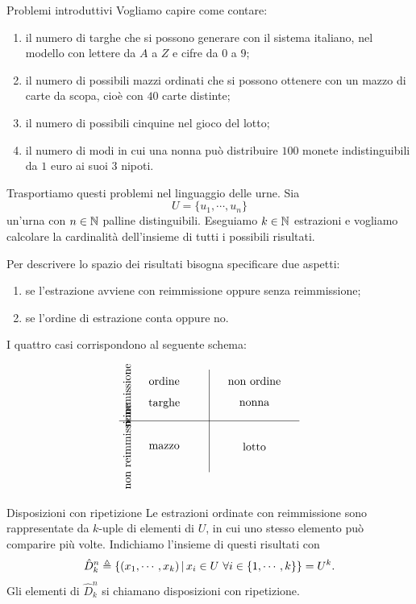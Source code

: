 \documentclass[a4paper]{article}
\begin{document}
\begin{snippetexample}{Problemi introduttivi}
    Vogliamo capire come contare:
    \begin{enumerate}
        \item il numero di targhe che si possono generare con il sistema italiano, nel modello con lettere da \(A\) a \(Z\) e cifre da \(0\) a \(9\);
        \item il numero di possibili mazzi ordinati che si possono ottenere con un mazzo di carte da scopa, cioè con \(40\) carte distinte;
        \item il numero di possibili cinquine nel gioco del lotto;
        \item il numero di modi in cui una nonna può distribuire \(100\) monete indistinguibili da \(1\) euro ai suoi \(3\) nipoti.
    \end{enumerate}
\end{snippetexample}

Trasportiamo questi problemi nel linguaggio delle urne.
Sia
\[
    U=\{u_1,\cdots,u_n\}
\]
un'urna con \(n\in\mathbb{N}\) palline distinguibili.
Eseguiamo \(k\in\mathbb{N}\) estrazioni e vogliamo calcolare la cardinalità dell'insieme di tutti i possibili risultati.

Per descrivere lo spazio dei risultati bisogna specificare due aspetti:
\begin{enumerate}
    \item se l'estrazione avviene con reimmissione oppure senza reimmissione;
    \item se l'ordine di estrazione conta oppure no.
\end{enumerate}

I quattro casi corrispondono al seguente schema:
\[
    \begin{tikzpicture}[baseline=(current bounding box.center)]
        \draw (-2.8,0) -- (2.8,0);
        \draw (0,-1.6) -- (0,1.6);
        \node at (-1.4,1.25) {ordine};
        \node at (1.4,1.25) {non ordine};
        \node[rotate=90] at (-2.55,0.8) {reimmissione};
        \node[rotate=90] at (-2.55,-0.8) {non reimmissione};
        \node at (-1.4,0.55) {targhe};
        \node at (1.4,0.55) {nonna};
        \node at (-1.4,-0.8) {mazzo};
        \node at (1.4,-0.8) {lotto};
    \end{tikzpicture}
\]

\begin{snippetdefinition}{Disposizioni con ripetizione}
    Le estrazioni ordinate con reimmissione sono rappresentate da \(k\)-uple di elementi di \(U\), in cui uno stesso elemento può comparire più volte.
    Indichiamo l'insieme di questi risultati con
    \[
        \hat D_k^n
        \triangleq
        \left\{
            (x_1,\cdots,x_k) \,|\, x_i\in U\ \forall i\in\{1,\cdots,k\}
        \right\}
        =
        U^k.
    \]
    Gli elementi di \(\hat D_k^n\) si chiamano disposizioni con ripetizione.
\end{snippetdefinition}
\end{document}
